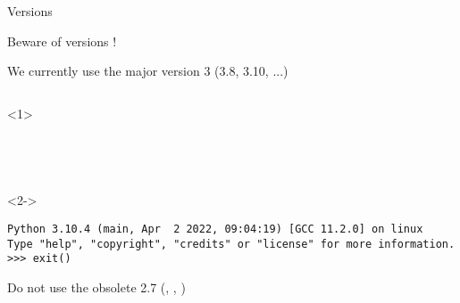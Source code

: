 %
%
%
%
%
%
%
%
%

\begin{frame}[fragile]{Versions}

   Beware of versions !

   We currently use the major version 3 (3.8, 3.10, ...)

  \begin{columns}[onlytextwidth]
    \begin{column}{\textwidth}

      \begin{onlyenv}<1>
        \begin{lstlisting}[style=sh]
%*\LSTPrompt*) python




 \end{lstlisting}
      \end{onlyenv}

      \begin{onlyenv}<2->
        \begin{lstlisting}[style=sh]
%*\LSTPrompt*) python
Python 3.10.4 (main, Apr  2 2022, 09:04:19) [GCC 11.2.0] on linux
Type "help", "copyright", "credits" or "license" for more information.
>>> exit() \end{lstlisting}
      \end{onlyenv}

     Do not use the obsolete 2.7 (, , )

    \end{column}
  \end{columns}
\end{frame}


